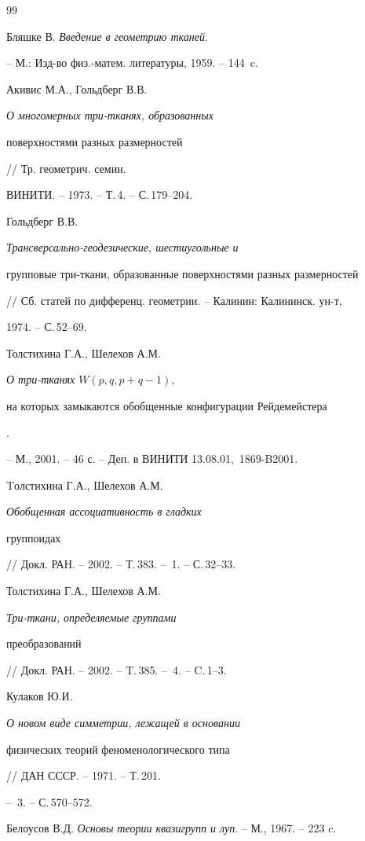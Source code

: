\begin{thebibliography}{99}







Бляшке В. {\em Введение в геометрию тканей}.


-- М.: Изд-во физ.-матем. литературы, 1959. -- 144~c.




Акивис М.А., Гольдберг В.В. {\em О многомерных три-тканях, образованных


поверхностями разных размерностей} // Тр. геометрич. семин.


ВИНИТИ. -- 1973. -- Т.\,4. -- С.\,179--204.




Гольдберг В.В. {\em Трансверсально-геодезические, шестиугольные и


групповые три-ткани, образованные поверхностями разных размерностей}


// Сб. статей по дифференц. геометрии. -- Калинин: Калининск. ун-т,


1974. -- С.\,52--69. 




Толстихина Г.А., Шелехов А.М. {\em О три-тканях $W(p,q,p+q-1)$,


на которых замыкаются обобщенные конфигурации Рейдемейстера}.


-- М., 2001. -- 46 с. -- Деп. в ВИНИТИ 13.08.01, \No\,1869-B2001.




Tолстихина Г.А., Шелехов А.М. {\em Обобщенная ассоциативность в гладких


группоидах} // Докл. РАН. -- 2002. -- Т.\,383. -- \No\,1. -- С.\,32--33.




Толстихина Г.А., Шелехов А.М. {\em Три-ткани, определяемые группами


преобразований} // Докл. РАН. -- 2002. -- T.\,385. -- \No\,4. -- C.\,1--3.




Кулаков Ю.И. {\em О новом виде симметрии, лежащей в основании


физических теорий феноменологического типа} // ДАН СССР. -- 1971. -- Т.\,201.


-- \No\,3. -- С.\,570--572.




Белоусов В.Д. {\em Основы теории квазигрупп и луп}. -- М., 1967. -- 223 c.



\end{thebibliography}

